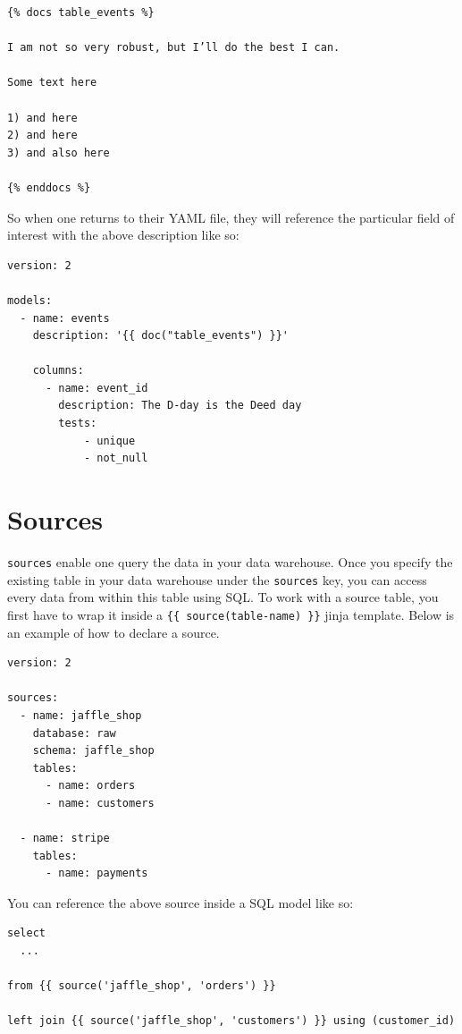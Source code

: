 \documentclass[
]{book}
\begin{document}
\begin{verbatim}
{% docs table_events %}

I am not so very robust, but I’ll do the best I can.

Some text here

1) and here
2) and here
3) and also here

{% enddocs %}
\end{verbatim}

So when one returns to their YAML file, they will reference the particular field of interest with the above description like so:

\begin{verbatim}
version: 2

models:
  - name: events
    description: '{{ doc("table_events") }}'

    columns:
      - name: event_id
        description: The D-day is the Deed day
        tests:
            - unique
            - not_null
\end{verbatim}

\hypertarget{sources}{%
\section{Sources}\label{sources}}

\texttt{sources} enable one query the data in your data warehouse. Once you specify the existing table in your data warehouse under the \texttt{sources} key, you can access every data from within this table using SQL. To work with a source table, you first have to wrap it inside a \texttt{\{\{\ source(table-name)\ \}\}} jinja template. Below is an example of how to declare a source.

\begin{verbatim}
version: 2

sources:
  - name: jaffle_shop
    database: raw  
    schema: jaffle_shop  
    tables:
      - name: orders
      - name: customers

  - name: stripe
    tables:
      - name: payments
\end{verbatim}

You can reference the above source inside a SQL model like so:

\begin{verbatim}
select
  ...

from {{ source('jaffle_shop', 'orders') }}

left join {{ source('jaffle_shop', 'customers') }} using (customer_id)

\end{verbatim}
\end{document}
